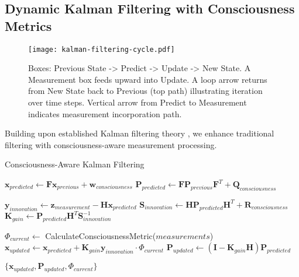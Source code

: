 \documentclass[12pt,a4paper]{article}
\begin{document}
\subsection{Dynamic Kalman Filtering with Consciousness Metrics}

\begin{figure}[H]
\centering
\texttt{[image: kalman-filtering-cycle.pdf]}
\caption{Boxes: Previous State -> Predict -> Update -> New State. A Measurement box feeds upward into Update. A loop arrow returns from New State back to Previous (top path) illustrating iteration over time steps. Vertical arrow from Predict to Measurement indicates measurement incorporation path.}
\label{fig:kalman-filtering-cycle}
\end{figure}

Building upon established Kalman filtering theory \cite{kalman1960,grewal2007,bar2011}, we enhance traditional filtering with consciousness-aware measurement processing.

\begin{algorithm}
\caption{Consciousness-Aware Kalman Filtering}
\begin{algorithmic}[1]
    \State $\mathbf{x}_{predicted} \gets \mathbf{F} \mathbf{x}_{previous} + \mathbf{w}_{consciousness}$
    \State $\mathbf{P}_{predicted} \gets \mathbf{F} \mathbf{P}_{previous} \mathbf{F}^T + \mathbf{Q}_{consciousness}$
    
    \State $\mathbf{y}_{innovation} \gets \mathbf{z}_{measurement} - \mathbf{H} \mathbf{x}_{predicted}$
    \State $\mathbf{S}_{innovation} \gets \mathbf{H} \mathbf{P}_{predicted} \mathbf{H}^T + \mathbf{R}_{consciousness}$
    \State $\mathbf{K}_{gain} \gets \mathbf{P}_{predicted} \mathbf{H}^T \mathbf{S}_{innovation}^{-1}$
    
    \State $\Phi_{current} \gets$ CalculateConsciousnessMetric($measurements$)
    \State $\mathbf{x}_{updated} \gets \mathbf{x}_{predicted} + \mathbf{K}_{gain} \mathbf{y}_{innovation} \cdot \Phi_{current}$
    \State $\mathbf{P}_{updated} \gets (\mathbf{I} - \mathbf{K}_{gain} \mathbf{H}) \mathbf{P}_{predicted}$
    
    \State \Return $\{\mathbf{x}_{updated}, \mathbf{P}_{updated}, \Phi_{current}\}$
\EndProcedure
\end{algorithmic}
\end{algorithm}
\end{document}
